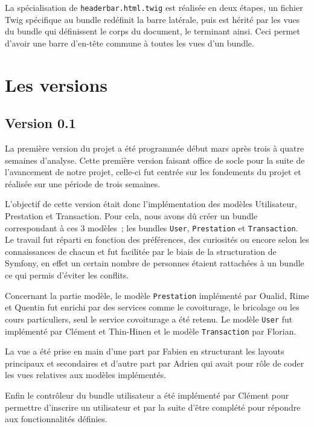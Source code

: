 La spécialisation de \verb|headerbar.html.twig| est réalisée en deux étapes, un fichier Twig spécifique au bundle redéfinit la barre latérale, puis est hérité par les vues du bundle qui définissent le corps du document, le terminant ainsi. Ceci permet d'avoir une barre d'en-tête commune à toutes les vues d'un bundle.

\section{Les versions}

\subsection{Version 0.1}

La première version du projet a été programmée début mars après trois à quatre semaines d'analyse. Cette première version faisant office de socle pour la suite de l'avancement de notre projet, celle-ci fut centrée sur les fondements du projet et réalisée sur une période de trois semaines.

L'objectif de cette version était donc l'implémentation des modèles Utilisateur, Prestation et Transaction. Pour cela, nous avons dû créer un bundle correspondant à ces 3 modèles~; les bundles \verb|User|, \verb|Prestation| et \verb|Transaction|. Le travail fut réparti en fonction des préférences, des curiosités ou encore selon les connaissances de chacun et fut facilitée par le biais de la structuration de Symfony, en effet un certain nombre de personnes étaient rattachées à un bundle ce qui permis d'éviter les conflits.

Concernant la partie modèle, le modèle \verb|Prestation| implémenté par Oualid, Rime et Quentin fut enrichi par des services comme le covoiturage, le bricolage ou les cours particuliers, seul le service covoiturage a été retenu. Le modèle \verb|User| fut implémenté par Clément et Thin-Hinen et le modèle \verb|Transaction| par Florian.

La vue a été prise en main d’une part par Fabien en structurant les layouts principaux et secondaires et d’autre part par Adrien qui avait pour rôle de coder les vues relatives aux modèles implémentés.

Enfin le contrôleur du bundle utilisateur a été implémenté par Clément pour permettre d’inscrire un utilisateur et par la suite d’être complété pour répondre aux fonctionnalités définies.

